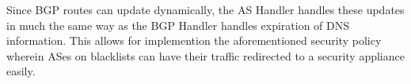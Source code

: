 Since BGP routes can update dynamically, the AS Handler handles these updates in much the same way as the BGP Handler handles expiration of DNS information. This allows for implemention the aforementioned security policy wherein ASes on blacklists can have their traffic redirected to a security appliance easily.

\begin{comment}
As \system{} is based on the SDX platform which contains a BGP-engine, we have access to BGP routes. The primary responsibilities are similar to those of the DNS handler, in that the AS handler needs to break down the high level policy into its constituent components and returning them to the MCM.

In the second example from section~\ref{sec:examples}, the AS handler would be responsible for breaking down the \tti{match\textunderscore{}AS()} into the constituent components. These components would be a series \tti{match()} actions on source IP addresses from packets to the IP ranges that AS~12345 was advertising. The parallel composition of all of these \tti{match()} would be composed with the \tti{drop()} action by the MCM.


Many networks, in particular home or small business networks, BGP information is not accessible. As such, this handler can be seen as optional.
\end{comment}



